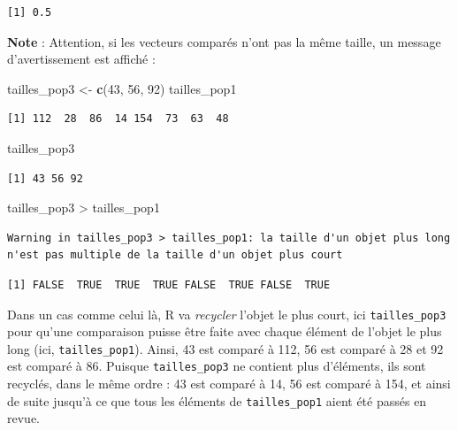 \documentclass[
  a4paper,
]{article}
\newenvironment{Shaded}{\begin{snugshade}}{\end{snugshade}}
\newcommand{\DecValTok}[1]{\textcolor[rgb]{0.69,0.50,0.00}{#1}}
\newcommand{\KeywordTok}[1]{\textcolor[rgb]{0.12,0.11,0.11}{\textbf{#1}}}
\newcommand{\NormalTok}[1]{\textcolor[rgb]{0.12,0.11,0.11}{#1}}
\newcommand{\OperatorTok}[1]{\textcolor[rgb]{0.12,0.11,0.11}{#1}}
\newcommand{\StringTok}[1]{\textcolor[rgb]{0.75,0.01,0.01}{#1}}
\begin{document}
\begin{verbatim}
[1] 0.5
\end{verbatim}

\textbf{Note} : Attention, si les vecteurs comparés n'ont pas la même taille, un message d'avertissement est affiché :

\begin{Shaded}
\begin{Highlighting}[]
\NormalTok{tailles_pop3 <-}\StringTok{ }\KeywordTok{c}\NormalTok{(}\DecValTok{43}\NormalTok{, }\DecValTok{56}\NormalTok{, }\DecValTok{92}\NormalTok{)}
\NormalTok{tailles_pop1}
\end{Highlighting}
\end{Shaded}

\begin{verbatim}
[1] 112  28  86  14 154  73  63  48
\end{verbatim}

\begin{Shaded}
\begin{Highlighting}[]
\NormalTok{tailles_pop3}
\end{Highlighting}
\end{Shaded}

\begin{verbatim}
[1] 43 56 92
\end{verbatim}

\begin{Shaded}
\begin{Highlighting}[]
\NormalTok{tailles_pop3 }\OperatorTok{>}\StringTok{ }\NormalTok{tailles_pop1}
\end{Highlighting}
\end{Shaded}

\begin{verbatim}
Warning in tailles_pop3 > tailles_pop1: la taille d'un objet plus long
n'est pas multiple de la taille d'un objet plus court
\end{verbatim}

\begin{verbatim}
[1] FALSE  TRUE  TRUE  TRUE FALSE  TRUE FALSE  TRUE
\end{verbatim}

Dans un cas comme celui là, R va \emph{recycler} l'objet le plus court, ici \texttt{tailles\_pop3} pour qu'une comparaison puisse être faite avec chaque élément de l'objet le plus long (ici, \texttt{tailles\_pop1}). Ainsi, 43 est comparé à 112, 56 est comparé à 28 et 92 est comparé à 86. Puisque \texttt{tailles\_pop3} ne contient plus d'éléments, ils sont recyclés, dans le même ordre : 43 est comparé à 14, 56 est comparé à 154, et ainsi de suite jusqu'à ce que tous les éléments de \texttt{tailles\_pop1} aient été passés en revue.
\end{document}
